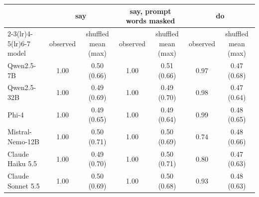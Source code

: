 \begin{tabular}{lcccccc}
\toprule
 & \multicolumn{2}{c}{say} & \multicolumn{2}{c}{say, prompt words masked} & \multicolumn{2}{c}{do} \\
\cmidrule(lr){2-3}\cmidrule(lr){4-5}\cmidrule(lr){6-7}
model & observed & shuffled mean (max) & observed & shuffled mean (max) & observed & shuffled mean (max) \\
\midrule
Qwen2.5-7B & 1.00 & 0.50 (0.66) & 1.00 & 0.51 (0.66) & 0.97 & 0.47 (0.68) \\
Qwen2.5-32B & 1.00 & 0.49 (0.69) & 1.00 & 0.49 (0.70) & 0.98 & 0.47 (0.64) \\
Phi-4 & 1.00 & 0.49 (0.65) & 1.00 & 0.49 (0.64) & 0.99 & 0.48 (0.65) \\
Mistral-Nemo-12B & 1.00 & 0.50 (0.71) & 1.00 & 0.50 (0.69) & 0.74 & 0.48 (0.66) \\
Claude Haiku 5.5 & 1.00 & 0.49 (0.70) & 1.00 & 0.50 (0.71) & 0.80 & 0.47 (0.63) \\
Claude Sonnet 5.5 & 1.00 & 0.50 (0.69) & 1.00 & 0.50 (0.68) & 0.93 & 0.48 (0.63) \\
\bottomrule
\end{tabular}
